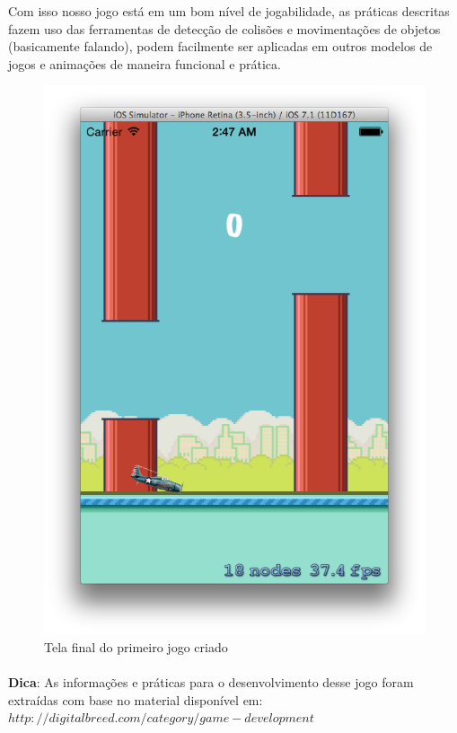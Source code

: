 \documentclass[a4paper,12pt,brazil,oneside]{book}
\begin{document}
Com isso nosso jogo está em um bom nível de jogabilidade, as práticas descritas fazem uso das ferramentas de detecção de colisões e movimentações de objetos (basicamente falando), podem facilmente ser aplicadas em outros modelos de jogos e animações de maneira funcional e prática.

\begin{figure}[H]
  \centering
  \includegraphics[width=.75\textwidth]{figuras/6/plane6.png}
  \caption{Tela final do primeiro jogo criado}
  \label{fig:a}
\end{figure}

\begin{framed}
\paragraph{}\textbf{Dica}: As informações e práticas para o desenvolvimento desse jogo foram extraídas com base no material disponível em:
\textit{ \\\(http://digitalbreed.com/category/game-development\)}
\end{framed}

\singlespace
{}
\cleardoublepage
\thispagestyle{empty}
{}


\doublespace
\end{document}
